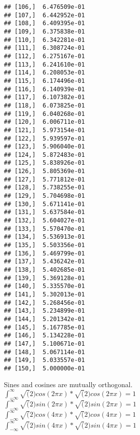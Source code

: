\documentclass[
]{article}
\begin{document}
\begin{verbatim}
## [106,]  6.476509e-01
## [107,]  6.442952e-01
## [108,]  6.409395e-01
## [109,]  6.375838e-01
## [110,]  6.342281e-01
## [111,]  6.308724e-01
## [112,]  6.275167e-01
## [113,]  6.241610e-01
## [114,]  6.208053e-01
## [115,]  6.174496e-01
## [116,]  6.140939e-01
## [117,]  6.107382e-01
## [118,]  6.073825e-01
## [119,]  6.040268e-01
## [120,]  6.006711e-01
## [121,]  5.973154e-01
## [122,]  5.939597e-01
## [123,]  5.906040e-01
## [124,]  5.872483e-01
## [125,]  5.838926e-01
## [126,]  5.805369e-01
## [127,]  5.771812e-01
## [128,]  5.738255e-01
## [129,]  5.704698e-01
## [130,]  5.671141e-01
## [131,]  5.637584e-01
## [132,]  5.604027e-01
## [133,]  5.570470e-01
## [134,]  5.536913e-01
## [135,]  5.503356e-01
## [136,]  5.469799e-01
## [137,]  5.436242e-01
## [138,]  5.402685e-01
## [139,]  5.369128e-01
## [140,]  5.335570e-01
## [141,]  5.302013e-01
## [142,]  5.268456e-01
## [143,]  5.234899e-01
## [144,]  5.201342e-01
## [145,]  5.167785e-01
## [146,]  5.134228e-01
## [147,]  5.100671e-01
## [148,]  5.067114e-01
## [149,]  5.033557e-01
## [150,]  5.000000e-01
\end{verbatim}

Sines and cosines are mutually orthogonal.
\(\int_{-\infty}^{\infty} \sqrt(2) cos(2\pi x)*\sqrt(2) cos(2\pi x)=1\)
\(\int_{-\infty}^{\infty} \sqrt(2) sin(2\pi x)*\sqrt(2) sin(2\pi x)=1\)
\(\int_{-\infty}^{\infty} \sqrt(2) cos(4\pi x)*\sqrt(2) cos(4\pi x)=1\)
\(\int_{-\infty}^{\infty} \sqrt(2) sin(4\pi x)*\sqrt(2) sin(4\pi x)=1\)
\end{document}
